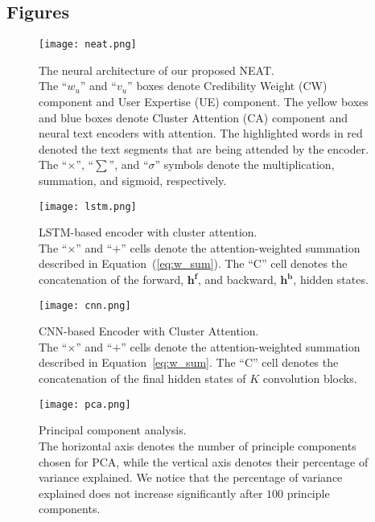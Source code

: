 \documentclass{bmcart}
\begin{document}
\begin{backmatter}
\pagebreak

\section*{Figures}
\begin{figure}[h!]
    \centering
    \captionsetup{justification=centering}
    \texttt{[image: neat.png]}
    \caption{The neural architecture of our proposed NEAT. \\ The ``$w_u$'' and ``$v_u$'' boxes denote Credibility Weight (CW) component and User Expertise (UE) component. The yellow boxes and blue boxes denote Cluster Attention (CA) component and neural text encoders with attention. The highlighted words in red denoted the text segments that are being attended by the encoder. The ``$\times$'', ``$\sum$'', and ``$\sigma$'' symbols denote the multiplication, summation, and sigmoid, respectively.}
    \label{fig:NEAT}
\end{figure}
\pagebreak
\begin{figure}[h!]
    \centering
    \captionsetup{justification=centering}
    \texttt{[image: lstm.png]}
    \caption{LSTM-based encoder with cluster attention. \\ The ``$\times$'' and ``$+$'' cells denote the attention-weighted summation described in Equation~(\ref{eq:w_sum}). The ``$\text{C}$'' cell denotes the concatenation of the forward, $\boldsymbol{h^f}$, and backward, $\boldsymbol{h^b}$, hidden states.}
    \label{fig:RNNEncoders}
\end{figure}
\pagebreak
\begin{figure}[h!]
    \centering
    \captionsetup{justification=centering}
    \texttt{[image: cnn.png]}
    \caption{CNN-based Encoder with Cluster Attention. \\ The ``$\times$'' and ``$+$'' cells denote the attention-weighted summation described in Equation~\ref{eq:w_sum}. The ``$\text{C}$'' cell denotes the concatenation of the final hidden states of $K$ convolution blocks.}
    \label{fig:CNNEncoders}
\end{figure}
\pagebreak
\begin{figure}[h!]
    \centering
    \captionsetup{justification=centering}
    \texttt{[image: pca.png]}
    \caption{Principal component analysis. \\ The horizontal axis denotes the number of principle components chosen for PCA, while the vertical axis denotes their percentage of variance explained. We notice that the percentage of variance explained does not increase significantly after $100$ principle components.}

\end{figure}
\end{backmatter}
\end{document}
